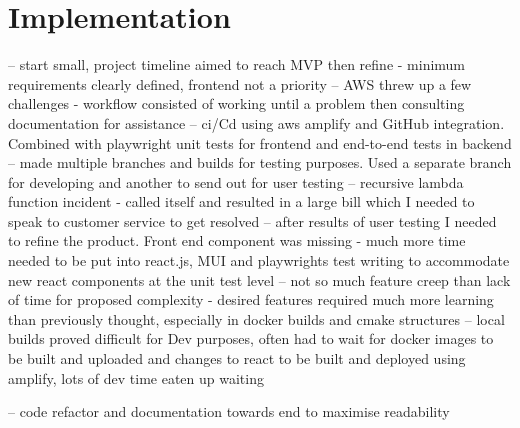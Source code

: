 \thispagestyle{plain}
\newpage
\section{Implementation}\label{sec:implementation}

\normalsize

-- start small, project timeline aimed to reach MVP then refine - minimum requirements clearly defined, frontend not a priority
-- AWS threw up a few challenges - workflow consisted of working until a problem then consulting documentation for assistance
-- ci/Cd using aws amplify and GitHub integration. Combined with playwright unit tests for frontend and end-to-end tests in backend
-- made multiple branches and builds for testing purposes. Used a separate branch for developing and another to send out for user testing
-- recursive lambda function incident - called itself and resulted in a large bill which I needed to speak to customer service to get resolved
-- after results of user testing I needed to refine the product. Front end component was missing - much more time needed to be put into react.js, MUI and playwrights test writing to accommodate new react components at the unit test level
-- not so much feature creep than lack of time for proposed complexity - desired features required much more learning than previously thought, especially in docker builds and cmake structures
-- local builds proved difficult for Dev purposes, often had to wait for docker images to be built and uploaded and changes to react to be built and deployed using amplify, lots of dev time eaten up waiting

-- code refactor and documentation towards end to maximise readability